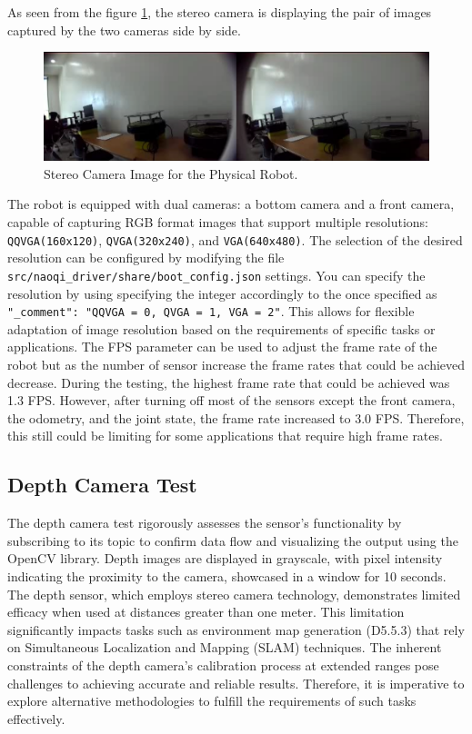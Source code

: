 \documentclass{CSSRforAfrica}
\begin{document}
As seen from the figure \ref{fig: Stereo Camera Image}, the stereo camera is displaying the pair of images captured by the 
two cameras side by side. 

\begin{figure}[!hbpt]
\centering
\includegraphics[scale=0.30]{images/stereoCamera.png}
\caption{Stereo Camera Image for the Physical Robot.}
\label{fig: Stereo Camera Image}
\end{figure}

The robot is equipped with dual cameras: a bottom camera and a front camera, capable of capturing RGB
format images that support multiple resolutions: \texttt{QQVGA(160x120)}, \texttt{QVGA(320x240)},
and \texttt{VGA(640x480)}. The selection of the desired resolution can be configured by modifying the file
\texttt{src/naoqi\_driver/share/boot\_config.json} settings. You can specify the resolution by using specifying
the integer accordingly to the once specified as \texttt{ "\_comment": "QQVGA = 0, QVGA = 1, VGA = 2"}. This allows
for flexible adaptation of image resolution based on the requirements of specific tasks or applications. The FPS 
parameter can be used to adjust the frame rate of the robot but as the number of sensor increase the frame rates
that could be achieved decrease. During the testing, the highest frame rate that could be achieved was 1.3 FPS.
However, after turning off most of the sensors except the front camera, the odometry, and the joint state, the frame rate
increased to 3.0 FPS. Therefore, this still could be limiting for some applications that require high frame rates.

\subsection{Depth Camera Test}
The depth camera test rigorously assesses the sensor's functionality by subscribing to its topic to confirm data flow 
and visualizing the output using the OpenCV library. Depth images are displayed in grayscale, with pixel intensity 
indicating the proximity to the camera, showcased in a window for 10 seconds. The depth sensor, which employs stereo camera technology, demonstrates limited efficacy when used at
distances greater than one meter. This limitation significantly impacts tasks such as environment map
generation (D5.5.3) that rely on Simultaneous Localization and Mapping (SLAM) techniques. The inherent
constraints of the depth camera's calibration process at extended ranges pose challenges to achieving
accurate and reliable results. Therefore, it is imperative to explore alternative methodologies to
fulfill the requirements of such tasks effectively.
\end{document}

